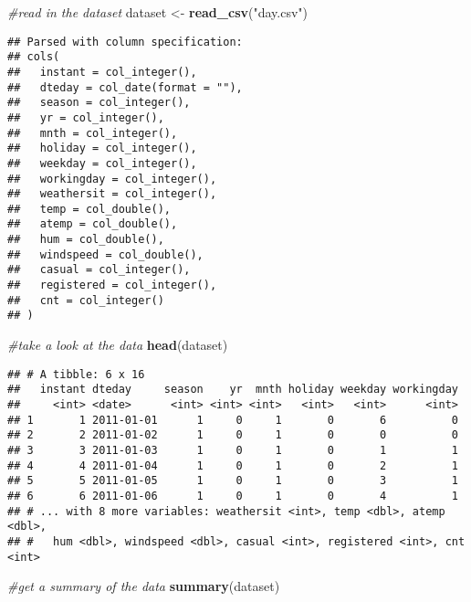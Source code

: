 \documentclass[]{article}
\newenvironment{Shaded}{\begin{snugshade}}{\end{snugshade}}
\newcommand{\KeywordTok}[1]{\textcolor[rgb]{0.13,0.29,0.53}{\textbf{#1}}}
\newcommand{\StringTok}[1]{\textcolor[rgb]{0.31,0.60,0.02}{#1}}
\newcommand{\CommentTok}[1]{\textcolor[rgb]{0.56,0.35,0.01}{\textit{#1}}}
\newcommand{\NormalTok}[1]{#1}
\begin{document}
\begin{Shaded}
\begin{Highlighting}[]
\CommentTok{#read in the dataset}
\NormalTok{dataset <-}\StringTok{ }\KeywordTok{read_csv}\NormalTok{(}\StringTok{"day.csv"}\NormalTok{)}
\end{Highlighting}
\end{Shaded}

\begin{verbatim}
## Parsed with column specification:
## cols(
##   instant = col_integer(),
##   dteday = col_date(format = ""),
##   season = col_integer(),
##   yr = col_integer(),
##   mnth = col_integer(),
##   holiday = col_integer(),
##   weekday = col_integer(),
##   workingday = col_integer(),
##   weathersit = col_integer(),
##   temp = col_double(),
##   atemp = col_double(),
##   hum = col_double(),
##   windspeed = col_double(),
##   casual = col_integer(),
##   registered = col_integer(),
##   cnt = col_integer()
## )
\end{verbatim}

\begin{Shaded}
\begin{Highlighting}[]
\CommentTok{#take a look at the data}
\KeywordTok{head}\NormalTok{(dataset)}
\end{Highlighting}
\end{Shaded}

\begin{verbatim}
## # A tibble: 6 x 16
##   instant dteday     season    yr  mnth holiday weekday workingday
##     <int> <date>      <int> <int> <int>   <int>   <int>      <int>
## 1       1 2011-01-01      1     0     1       0       6          0
## 2       2 2011-01-02      1     0     1       0       0          0
## 3       3 2011-01-03      1     0     1       0       1          1
## 4       4 2011-01-04      1     0     1       0       2          1
## 5       5 2011-01-05      1     0     1       0       3          1
## 6       6 2011-01-06      1     0     1       0       4          1
## # ... with 8 more variables: weathersit <int>, temp <dbl>, atemp <dbl>,
## #   hum <dbl>, windspeed <dbl>, casual <int>, registered <int>, cnt <int>
\end{verbatim}

\begin{Shaded}
\begin{Highlighting}[]
\CommentTok{#get a summary of the data}
\KeywordTok{summary}\NormalTok{(dataset)}
\end{Highlighting}
\end{Shaded}
\end{document}
